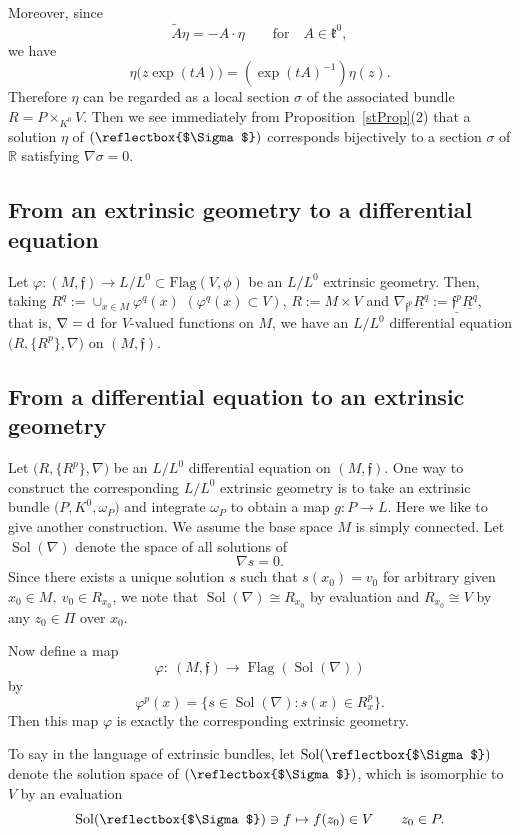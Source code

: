 \documentclass[pdftex]{sigma}%
\newcommand{\R}{\mathbb R}
\newcommand{\f}{\mathfrak f}
\newcommand{\kf}{\mathfrak k}
\newcommand{\Flag}{\operatorname{Flag}}
\newcommand{\Sol}{\operatorname{Sol}}
\DeclareRobustCommand{\amgiS}{\text{\reflectbox{$\Sigma$}}}
\numberwithin{equation}{section}
\begin{document}
Moreover, since
\[
\tilde A \eta = -A\cdot \eta\qquad\text{for}\quad A\in \kf^0,
\]
we have
\[
\eta\big(z\exp(tA)\big) = \left(\exp(tA)^{-1}\right)\eta(z).
\]
Therefore $\eta$ can be regarded as a local section $\sigma$ of the associated bundle $R=P\times_{K^0} V$. Then we see immediately from Proposition~\ref{stProp}(2) that a solution $\eta$ of $(\amgiS)$ corresponds bijectively to a section $\sigma$ of $\R$ satisfying $\nabla\sigma = 0$.


\subsection{From an extrinsic geometry to a differential equation}

Let $\varphi\colon (M,\f) \to L/L^0 \subset \mathrm{Flag}(V,\phi)$
be an $L/L^0$ extrinsic geometry.
Then, taking $R^q:=\cup_{x\in M}\varphi^q(x)$ $(\varphi^q(x)\subset V)$,
$R:=M\times V$
and $\nabla_{\f^p}\underline{R^q}:=\underline{\f^p} \underline{R^q}$, that is, $\nabla={\rm d}$ for $V$-valued functions on $M$, we have an $L/L^0$ differential equation $\big(R,\{ R^p\},\nabla\big)$ on $(M,\f)$.


\subsection{From a differential equation to an extrinsic geometry}

Let $\big(R, \{R^p\}, \nabla\big)$ be an $L/L^0$ differential equation on $(M, \f )$. One way to construct the corresponding
$L/L^0$ extrinsic geometry is to take an extrinsic bundle $\big(P, K^0, \omega_P\big)$ and integrate
$\omega_P $ to obtain a map $g\colon P \to L$.
Here we like to give another construction.
We assume the base space $M$ is simply connected.
Let $\Sol(\nabla)$ denote the space of all solutions of
\[
	\nabla s = 0 .
\]
Since there exists a unique solution $s$ such that $s(x_0) = v_0$ for arbitrary given $x_0 \in M, \ v_0 \in R_{x_0}$,
we note that $\Sol(\nabla ) \cong R_{x_0}$ by evaluation and
$R_{x_0} \cong V$ by any $z_0 \in \Pi$ over $x_0$.

Now define a map
\[
\varphi\colon\ (M, \f) \to \Flag(\Sol(\nabla))
\]
by
\[
	\varphi^p(x) = \big\{ s \in \Sol(\nabla) \colon s(x) \in R^p_x \big\}.
\]
Then this map $\varphi$ is exactly the corresponding extrinsic geometry.

To say in the language of extrinsic bundles, let $\Sol(\amgiS)$ denote the solution space of $(\amgiS)$, which is isomorphic to $V$ by an evaluation
\[
\Sol(\amgiS) \ni f \mapsto f(z_0) \in V \qquad z_0 \in P.
\]
\end{document}
